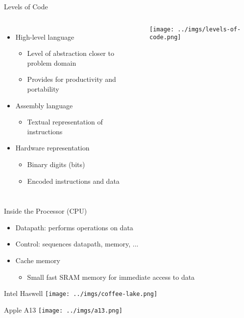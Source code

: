 \documentclass{beamer}
\begin{document}
\begin{frame}{Levels of Code}
\begin{columns}[c]
\begin{itemize}
\item High-level language
\begin{itemize}
\item Level of abstraction closer to problem domain
\item Provides for productivity and portability 
\end{itemize}
\item Assembly language
\begin{itemize}
\item Textual representation of instructions
\end{itemize}
\item Hardware representation
\begin{itemize}
\item Binary digits (bits)
\item Encoded instructions and data
\end{itemize}
\end{itemize}
\texttt{[image: ../imgs/levels-of-code.png]}
\end{columns}
\end{frame}

\begin{frame}{Inside the Processor (CPU)}
\begin{itemize}
\item Datapath: performs operations on data
\item Control: sequences datapath, memory, ...
\item Cache memory
\begin{itemize}
\item Small fast SRAM memory for immediate access to data
\end{itemize}
\end{itemize}
\end{frame}

\begin{frame}{Intel Haswell}
\texttt{[image: ../imgs/coffee-lake.png]}
\end{frame}

\begin{frame}{Apple A13}
\texttt{[image: ../imgs/a13.png]}
\end{frame}
\end{document}
